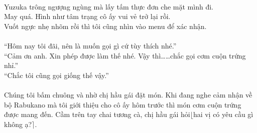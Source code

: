 \documentclass[12pt,a4paper, twosides]{book}
\begin{document}
\\
Yuzuka trông ngượng ngùng mà lấy tấm thực đơn che mặt mình đi.\\
May quá. Hình như tâm trạng cô ấy vui vẻ trở lại rồi.\\
Vuốt ngực nhẹ nhõm rồi thì tôi cũng nhìn vào menu để xác nhận.\\
\\
“Hôm nay tôi đãi, nên là muốn gọi gì cứ tùy thích nhé.”\\
“Cảm ơn anh. Xin phép được làm thế nhé. Vậy thì……chắc gọi cơm cuộn trứng nhỉ.”\\
“Chắc tôi cũng gọi giống thế vậy.”\\
\\
Chúng tôi bấm chuông và nhờ chị hầu gái đặt món. Khi đang nghe cảm nhận về bộ Rabukano mà tôi giới thiệu cho cô ấy hôm trước thì món cơm cuộn trứng được mang đến. Cầm trên tay chai tương cà, chị hầu gái hỏi$\lfloor$hai vị có yêu cầu gì không ạ?$\rceil$.\\
\end{document}
